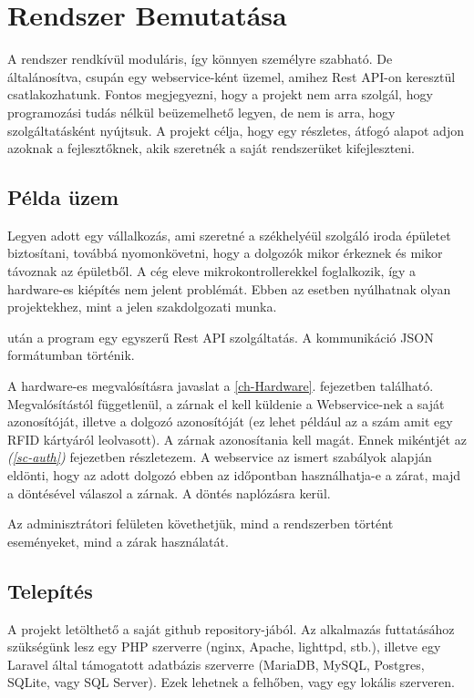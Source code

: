\documentclass[a4paper,12pt]{thesis-ekf}
\theoremstyle{definition}
\begin{document}
	\chapter{Rendszer Bemutatása}\label{ch-SystemIntro}
		A rendszer rendkívül moduláris, így könnyen személyre szabható. De általánosítva, csupán egy webservice-ként üzemel, amihez Rest API-on keresztül csatlakozhatunk. Fontos megjegyezni, hogy a projekt nem arra szolgál, hogy programozási tudás nélkül beüzemelhető legyen, de nem is arra, hogy szolgáltatásként nyújtsuk. A projekt célja, hogy egy részletes, átfogó alapot adjon azoknak a fejlesztőknek, akik szeretnék a saját rendszerüket kifejleszteni.
		
		\section{Példa üzem}
		Legyen adott egy vállalkozás, ami szeretné a székhelyéül szolgáló iroda épületet biztosítani, továbbá nyomonkövetni, hogy a dolgozók mikor érkeznek és mikor távoznak az épületből. A cég eleve mikrokontrollerekkel foglalkozik, így a hardware-es kiépítés nem jelent problémát. Ebben az esetben nyúlhatnak olyan projektekhez, mint a jelen szakdolgozati munka.
		
		\emph{} után a program egy egyszerű Rest API szolgáltatás. A kommunikáció JSON formátumban történik. 
		
		A hardware-es megvalósításra javaslat a \ref{ch-Hardware}. fejezetben található. Megvalósítástól függetlenül, a zárnak el kell küldenie a Webservice-nek a saját azonosítóját, illetve a dolgozó azonosítóját (ez lehet például az a szám amit egy RFID kártyáról leolvasott). A zárnak azonosítania kell magát. Ennek mikéntjét az \emph{ (\ref{sc-auth})} fejezetben részlet\-ezem. A webservice az ismert szabályok alapján eldönti, hogy az adott dolgozó ebben az időpontban használhatja-e a zárat, majd a döntésével válaszol a zárnak. A döntés naplózásra kerül.
		
		Az adminisztrátori felületen követhetjük, mind a rendszerben történt eseményeket, mind a zárak használatát.
		
		\section{Telepítés}\label{sc-Installation}
		 A projekt letölthető a saját github repository-jából\cite{repo}. Az alkalmazás futtatásához szükségünk lesz egy PHP szerverre (nginx, Apache, lighttpd, stb.)\cite{php-servers}, illetve egy Laravel által támogatott adatbázis szerverre (MariaDB, MySQL, Postgres, SQLite, vagy SQL Server)\cite{supported-dbms}. Ezek lehetnek a felhőben, vagy egy lokális szerveren. 
		
\end{document}
